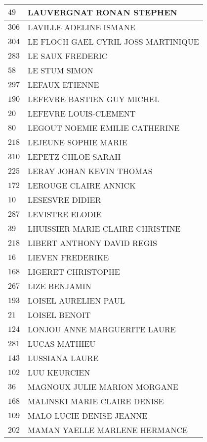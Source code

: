 \begin{xltabular}{\linewidth}{|l|X|}
    $49$ & LAUVERGNAT RONAN STEPHEN \\
    \hline
    $306$ & LAVILLE ADELINE ISMANE \\
    \hline
    $304$ & LE FLOCH GAEL CYRIL JOSS MARTINIQUE \\
    \hline
    $283$ & LE SAUX FREDERIC \\
    \hline
    $58$ & LE STUM SIMON \\
    \hline
    $297$ & LEFAUX ETIENNE \\
    \hline
    $190$ & LEFEVRE BASTIEN GUY MICHEL \\
    \hline
    $20$ & LEFEVRE LOUIS-CLEMENT \\
    \hline
    $80$ & LEGOUT NOEMIE EMILIE CATHERINE \\
    \hline
    $218$ & LEJEUNE SOPHIE MARIE \\
    \hline
    $310$ & LEPETZ CHLOE SARAH \\
    \hline
    $225$ & LERAY JOHAN KEVIN THOMAS \\
    \hline
    $172$ & LEROUGE CLAIRE ANNICK \\
    \hline
    $10$ & LESESVRE DIDIER \\
    \hline
    $287$ & LEVISTRE ELODIE \\
    \hline
    $39$ & LHUISSIER MARIE CLAIRE CHRISTINE \\
    \hline
    $218$ & LIBERT ANTHONY DAVID REGIS \\
    \hline
    $16$ & LIEVEN FREDERIKE \\
    \hline
    $168$ & LIGERET CHRISTOPHE \\
    \hline
    $267$ & LIZE BENJAMIN \\
    \hline
    $193$ & LOISEL AURELIEN PAUL \\
    \hline
    $21$ & LOISEL BENOIT \\
    \hline
    $124$ & LONJOU ANNE MARGUERITE LAURE \\
    \hline
    $281$ & LUCAS MATHIEU \\
    \hline
    $143$ & LUSSIANA LAURE \\
    \hline
    $102$ & LUU KEURCIEN \\
    \hline
    $36$ & MAGNOUX JULIE MARION MORGANE \\
    \hline
    $168$ & MALINSKI MARIE CLAIRE DENISE \\
    \hline
    $109$ & MALO LUCIE DENISE JEANNE \\
    \hline
    $202$ & MAMAN YAELLE MARLENE HERMANCE \\

\end{xltabular}
